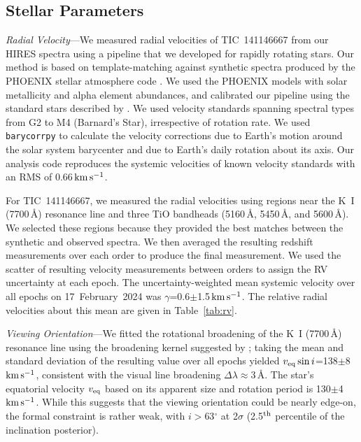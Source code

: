 \documentclass{nature3}
\newcommand{\kms}{\ensuremath{\rm km\,s^{-1}}}
\begin{document}
\begin{methods}
\subsection{Stellar Parameters}\phantom{+}
\label{subsec:stparams}

{\it Radial Velocity}---We measured radial velocities of TIC~141146667
from our HIRES spectra using a pipeline that we developed for
rapidly rotating stars.  Our method is based on template-matching
against synthetic spectra produced by the PHOENIX stellar atmosphere
code \cite{Husser2013}.  We used the PHOENIX models with solar
metallicity and alpha element abundances, and calibrated our pipeline
using the standard stars described by \cite{Chubak2012}.  We used
velocity standards spanning spectral types from G2 to M4 (Barnard's
Star), irrespective of rotation rate.  We used \texttt{barycorrpy}
\cite{Kanodia2018} to calculate the velocity corrections due to Earth's
motion around the solar system barycenter and due to Earth's daily
rotation about its axis.  Our analysis code reproduces the systemic
velocities of known velocity standards \cite{Chubak2012} with an RMS of
0.66\,\kms.

For TIC~141146667, we measured the radial velocities using regions near
the K~I (7700\,\AA) resonance line and three TiO bandheads (5160\,\AA,
5450\,\AA, and 5600\,\AA).  We selected these regions because they
provided the best matches between the synthetic and observed spectra.
We then averaged the resulting redshift measurements over each order to
produce the final measurement.  We used the scatter of resulting
velocity measurements between orders to assign the RV uncertainty at
each epoch.  The uncertainty-weighted mean systemic velocity over all
epochs on 17~February~2024 was $\gamma$=0.6$\pm$1.5\,\kms.  The
relative radial velocities about this mean are given in
Table~\ref{tab:rv}.

{\it Viewing Orientation}---We fitted the rotational broadening of the
K~I (7700\,\AA) resonance line using the broadening kernel suggested by
\cite{Gray2008}; taking the mean and standard deviation of the resulting
value over all epochs yielded $v_{\rm eq} \sin i$=138$\pm$8\,\kms,
consistent with the visual line broadening $\Delta
\lambda$$\approx$3\,\AA.  The star's equatorial velocity $v_{\rm eq}$
based on its apparent size and rotation period is 130$\pm$4\,\kms.
While this suggests that the viewing orientation could be nearly
edge-on, the formal constraint is rather weak, with $i$$>$63$^\circ$ at
2$\sigma$ (2.5$^{\rm th}$ percentile of the inclination posterior).


\end{methods}
\end{document}
